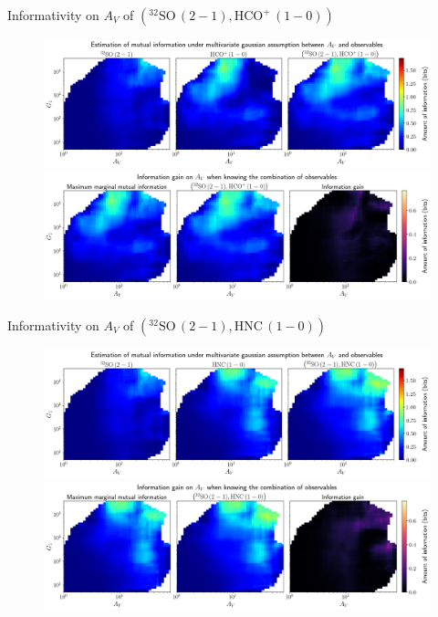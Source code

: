 \documentclass{beamer}
\begin{document}
\begin{frame}{Informativity on $A_V$ of $\left(\mathrm{^{32}SO\,(2-1)},\mathrm{HCO^+\,(1-0)}\right)$}
    \begin{figure}
        \centering
        \includegraphics[width=0.95\linewidth]{../linearinfogauss/av__32so21_hcop10_linearinfogauss.png}
        \vfill
        \includegraphics[width=0.95\linewidth]{../linearinfogauss/av__32so21_hcop10_linearinfogauss_gain.png}
    \end{figure}
\end{frame}

\begin{frame}{Informativity on $A_V$ of $\left(\mathrm{^{32}SO\,(2-1)},\mathrm{HNC\,(1-0)}\right)$}
    \begin{figure}
        \centering
        \includegraphics[width=0.95\linewidth]{../linearinfogauss/av__32so21_hnc10_linearinfogauss.png}
        \vfill
        \includegraphics[width=0.95\linewidth]{../linearinfogauss/av__32so21_hnc10_linearinfogauss_gain.png}
    \end{figure}
\end{frame}
\end{document}
